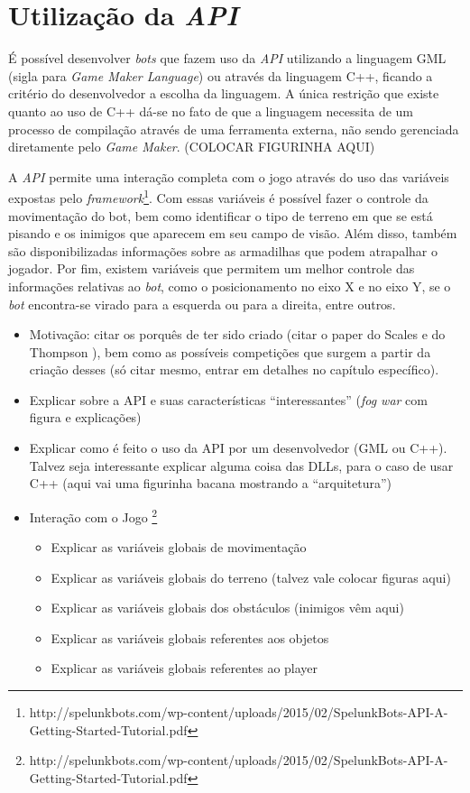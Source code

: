 \section{Utilização da \textit{API}}

É possível desenvolver \textit{bots} que fazem uso da \textit{API}
utilizando a linguagem GML (sigla para \textit{Game Maker Language}) ou
através da linguagem C++, ficando a critério do desenvolvedor a escolha da
linguagem. A única restrição que existe quanto ao uso de C++ dá-se no fato
de que a linguagem necessita de um processo de compilação através de uma
ferramenta externa, não sendo gerenciada diretamente pelo \textit{Game
Maker}. (COLOCAR FIGURINHA AQUI)

A \textit{API} permite uma interação completa com o jogo através do uso
das variáveis expostas pelo
\textit{framework}\footnote{http://spelunkbots.com/wp-content/uploads/2015/02/SpelunkBots-API-A-Getting-Started-Tutorial.pdf}.
Com essas variáveis é possível fazer o controle da movimentação do bot, bem
como identificar o tipo de terreno em que se está pisando e os inimigos que
aparecem em seu campo de visão. Além disso, também são disponibilizadas
informações sobre as armadilhas que podem atrapalhar o jogador. Por fim,
existem variáveis que permitem um melhor controle das informações relativas ao
\textit{bot}, como o posicionamento no eixo X e no eixo Y, se o \textit{bot}
encontra-se virado para a esquerda ou para a direita, entre outros.

\begin{itemize}
    \item Motivação: citar os porquês de ter sido criado (citar o paper do
        Scales e do Thompson \cite{SPELUNKBOTSPAPER}), bem como as possíveis
        competições que surgem a partir da criação desses (só citar mesmo,
        entrar em detalhes no capítulo específico).
    \item Explicar sobre a API e suas características ``interessantes''
        (\textit{fog war} com figura e explicações)
    \item Explicar como é feito o uso da API por um desenvolvedor (GML ou
        C++). Talvez seja interessante explicar alguma coisa das DLLs,
        para o caso de usar C++ (aqui vai uma figurinha bacana mostrando a
        ``arquitetura'')
    \item Interação com o Jogo
        \footnote{http://spelunkbots.com/wp-content/uploads/2015/02/SpelunkBots-API-A-Getting-Started-Tutorial.pdf}
    \begin{itemize}
        \item Explicar as variáveis globais de movimentação
        \item Explicar as variáveis globais do terreno (talvez vale
            colocar figuras aqui)
        \item Explicar as variáveis globais dos obstáculos (inimigos vêm aqui)
        \item Explicar as variáveis globais referentes aos objetos
        \item Explicar as variáveis globais referentes ao player
    \end{itemize}
\end{itemize}
